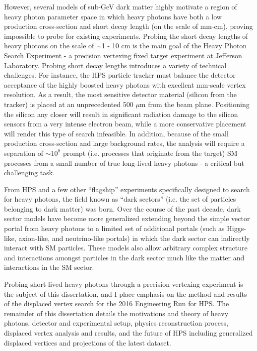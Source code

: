 However, several models of sub-GeV dark matter highly motivate a region of heavy photon parameter space in which heavy photons have both a low production cross-section and short decay length (on the scale of mm-cm), proving impossible to probe for existing experiments. Probing the short decay lengths of heavy photons on the scale of $\sim$1 - 10 cm is the main goal of the Heavy Photon Search Experiment - a precision vertexing fixed target experiment at Jefferson Laboratory. Probing short decay lengths introduces a variety of technical challenges. For instance, the HPS particle tracker must balance the detector acceptance of the highly boosted heavy photons with excellent mm-scale vertex resolution.  As a result, the most sensitive detector material (silicon from the tracker) is placed at an unprecedented 500 $\mu$m from the beam plane. Positioning the silicon any closer will result in significant radiation damage to the silicon sensors from a very intense electron beam, while a more conservative placement will render this type of search infeasible. In addition, because of the small production cross-section and large background rates, the analysis will require a separation of $\sim 10^8$ prompt (i.e. processes that originate from the target) SM processes from a small number of true long-lived heavy photons - a critical but challenging task. %

From HPS and a few other ``flagship'' experiments specifically designed to search for heavy photons, the field known as ``dark sectors'' (i.e. the set of particles belonging to dark matter) was born. Over the course of the past decade, dark sector models have become more generalized extending beyond the simple vector portal from heavy photons to a limited set of additional portals (such as Higgs-like, axion-like, and neutrino-like portals) in which the dark sector can indirectly interact with SM particles. These models also allow arbitrary complex structure and interactions amongst particles in the dark sector much like the matter and interactions in the SM sector.

Probing short-lived heavy photons through a precision vertexing experiment is the subject of this dissertation, and I place emphasis on the method and results of the displaced vertex search for the 2016 Engineering Run for HPS. The remainder of this dissertation details the motivations and theory of heavy photons, detector and experimental setup, physics reconstruction process, displaced vertex analysis and results, and the future of HPS including generalized displaced vertices and projections of the latest dataset.

